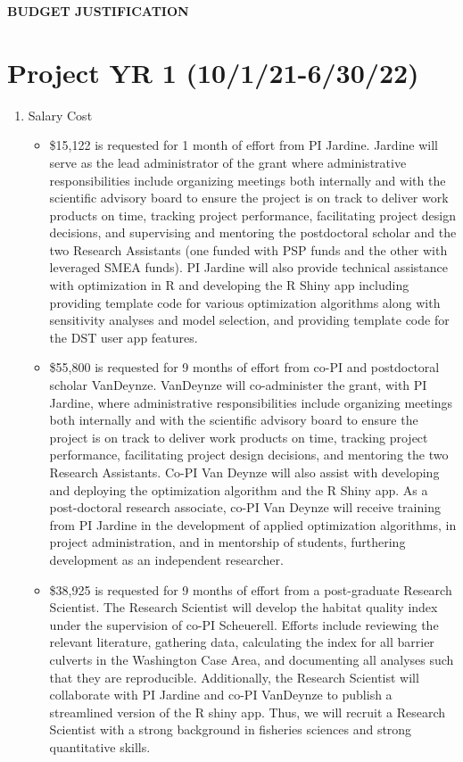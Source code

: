 \begin{center} \textbf{BUDGET JUSTIFICATION} \end{center}


\section*{Project YR 1 (10/1/21-6/30/22)}
\begin{enumerate}
\item Salary Cost
\begin{itemize}
\item  \$15,122 is requested for 1 month of effort from PI Jardine. Jardine will serve as the lead administrator of the grant where administrative responsibilities include organizing meetings both internally and with the scientific advisory board to ensure the project is on track to deliver work products on time, tracking project performance, facilitating project design decisions, and supervising and mentoring the postdoctoral scholar and the two Research Assistants (one funded with PSP funds and the other with leveraged SMEA funds). PI Jardine will also provide technical assistance with optimization in R and developing the R Shiny app including providing template code for various optimization algorithms along with sensitivity analyses and model selection, and providing template code for the DST user app features.
\item \$55,800 is requested for 9 months of effort from co-PI and postdoctoral scholar VanDeynze. VanDeynze will co-administer the grant, with PI Jardine, where administrative responsibilities include organizing meetings both internally and with the scientific advisory board to ensure the project is on track to deliver work products on time, tracking project performance, facilitating project design decisions, and mentoring the two Research Assistants. Co-PI Van Deynze will also assist with developing and deploying the optimization algorithm and the R Shiny app. As a post-doctoral research associate, co-PI Van Deynze will receive training from PI Jardine in the development of applied optimization algorithms, in project administration, and in mentorship of students, furthering development as an independent researcher. 
\item \$38,925 is requested for 9 months of effort from a post-graduate Research Scientist. The Research Scientist will develop the habitat quality index under the supervision of co-PI Scheuerell. Efforts include reviewing the relevant literature, gathering data, calculating the index for all barrier culverts in the Washington Case Area, and documenting all analyses such that they are reproducible. Additionally, the Research Scientist will collaborate with PI Jardine and co-PI VanDeynze to publish a streamlined version of the R shiny app. Thus, we will recruit a Research Scientist with a strong background in fisheries sciences and strong quantitative skills.

\end{itemize}
\end{enumerate}
